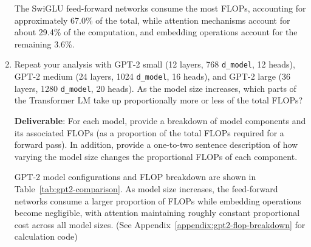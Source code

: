 \begin{enumerate}[label=(\alph*)]
\begin{answer}
    The SwiGLU feed-forward networks consume the most FLOPs, accounting for approximately 67.0\% of the total, while attention mechanisms account for about 29.4\% of the computation, and embedding operations account for the remaining 3.6\%.
    \end{answer}
    
    \item Repeat your analysis with GPT-2 small (12 layers, 768 \lstinline{d_model}, 12 heads), GPT-2 medium (24 layers, 1024 \lstinline{d_model}, 16 heads), and GPT-2 large (36 layers, 1280 \lstinline{d_model}, 20 heads). As the model size increases, which parts of the Transformer LM take up proportionally more or less of the total FLOPs?
    
    \textbf{Deliverable}: For each model, provide a breakdown of model components and its associated FLOPs (as a proportion of the total FLOPs required for a forward pass). In addition, provide a one-to-two sentence description of how varying the model size changes the proportional FLOPs of each component.
    
    \begin{answer}
    GPT-2 model configurations and FLOP breakdown are shown in Table~\ref{tab:gpt2-comparison}. 
    As model size increases, the feed-forward networks consume a larger proportion of FLOPs while embedding operations become negligible, with attention maintaining roughly constant proportional cost across all model sizes. (See Appendix~\ref{appendix:gpt2-flop-breakdown} for calculation code)
    \end{answer}
    

\end{enumerate}
